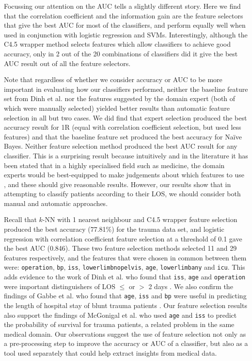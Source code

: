 


Focussing our attention on the AUC tells a slightly different story. Here we
find that the correlation coefficient and the information gain are the feature
selectors that give the best AUC for most of the classifiers, and perform
equally well when used in conjunction with logistic regression and SVMs.
Interestingly, although the C4.5
wrapper method selects features which allow classifiers to achieve good
accuracy, only in 2 out of the 20 combinations of classifiers did it give the
best AUC result out of all the feature selectors. 

Note that regardless of whether we consider accuracy or AUC to be more
important in evaluating how our classifiers performed, neither the baseline
feature set from Dinh et al. \cite{Dinh2013a} nor the features suggested by
the domain expert (both of which were manually selected) yielded better
results than automatic feature selection in all but two cases. We did find
that expert selection produced the best accuracy result for 1R (equal with
correlation coefficient selection, but used less features) and that the
baseline feature set produced the best accuracy for Na\"{i}ve Bayes. Neither
feature selection method produced the best AUC result for any classifier.
This is a surprising result because intuitively and in the literature it
has been stated that in a highly specialised field such as medicine, the domain
experts would be best-equipped to make judgements about which features to
use \cite{Witten2005}, and these should give reasonable results. However,
our results show that in attempting to classify patients according to their
LOS, we should consider both manual and automatic approaches.

Recall that $k$-NN with 1 nearest neighbour and C4.5 wrapper feature
selection produced the best accuracy (77.81\%) for the trauma data set, and
logistic regression with correlation coefficient feature selection at a
threshold of 0.1 gave the best AUC (0.846). These two feature selection
methods selected 11 and 29 features respectively, and the features that
were chosen in common between them were: \texttt{operation}, \texttt{bp},
\texttt{iss}, \texttt{lowerlimbnopelvis}, \texttt{age}, \texttt{lowerlimbany}
and \texttt{icu}. This adds evidence to the work of Dinh et al. who found
that \texttt{iss}, \texttt{age} and \texttt{operation} were important
distinguishers of LOS $\leq$ or $>$ 2 days \cite{Dinh2013a}. We also
confirm the findings of Gabbe et al. who found that \texttt{age},
\texttt{iss} and \texttt{bp} were useful in predicting the length of
hospital stay of blunt trauma patients \cite{Gabbe2005}. Our feature
selection results also
support the findings of McGonigal et al. \cite{McGonigal1993} who used
\texttt{age} and
\texttt{iss} to predict the probability of survival for trauma patients, a
related problem in the same medical domain.
Our observations suggest the use of feature selection not only as a
pre-processing step to improve the accuracy or AUC of a classifier, but also
as a tool used separately that could help extract insights from medical data.

